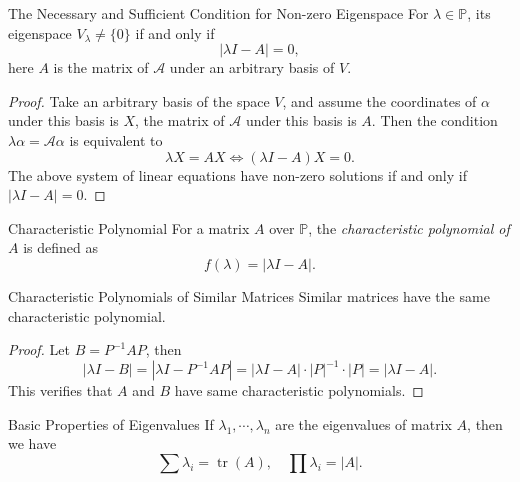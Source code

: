 \begin{proposition}{The Necessary and Sufficient Condition for Non-zero Eigenspace}{}
  For $\lambda \in \mathbb{P}$, its eigenspace $V_{\lambda} \neq \{0\}$ if and
  only if
  \begin{equation}
    |\lambda I - A| = 0,
  \end{equation}
  here $A$ is the matrix of $\mathcal{A}$ under an arbitrary basis of $V$.
\end{proposition}

\begin{proof}
  Take an arbitrary basis of the space $V$,
  and assume the coordinates of $\alpha$ under this basis is $X$,
  the matrix of $\mathcal{A}$ under this basis is $A$.
  Then the condition $\lambda \alpha = \mathcal{A}\alpha$ is equivalent to
  \begin{equation}
    \lambda X = A X \Leftrightarrow (\lambda I - A)X = 0.
  \end{equation}
  The above system of linear equations have non-zero solutions if and only if $|\lambda I
  - A| = 0$.
\end{proof}

\begin{definition}{Characteristic Polynomial}{}
  For a matrix $A$ over $\mathbb{P}$,
  the \emph{characteristic polynomial of $A$} is defined as
  \begin{equation}
    f(\lambda) = |\lambda I - A|.
  \end{equation}
\end{definition}

\begin{proposition}{Characteristic Polynomials of Similar Matrices}{}
  Similar matrices have the same characteristic polynomial.
\end{proposition}

\begin{proof}
  Let $B = P^{-1}AP$, then
  \begin{equation}
    |\lambda I - B| = |\lambda I - P^{-1}AP| = |\lambda I - A| \cdot |P|^{-1} \cdot |P| =
    |\lambda I - A|.
  \end{equation}
  This verifies that $A$ and $B$ have same characteristic polynomials.
\end{proof}

\begin{proposition}{Basic Properties of Eigenvalues}{}
  If $\lambda_1,\cdots,\lambda_n$ are the eigenvalues of matrix $A$,
  then we have
  \begin{equation}
    \sum \lambda_i = \operatorname{tr}(A),\quad
    \prod \lambda_i = |A|.
  \end{equation}
\end{proposition}

